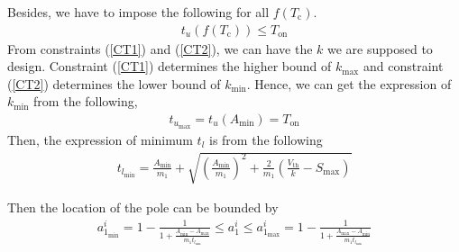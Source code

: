 Besides, we have to impose the following for all $f(T_{\text{c}})$.
\begin{align} \label{CT2}
t_u(f(T_{\text{c}})) \leq T_{\text{on}}
\end{align}
From constraints (\ref{CT1}) and (\ref{CT2}), we can have the $k$ we are supposed to design. Constraint (\ref{CT1}) determines the higher bound of $k_{\text{max}}$ and constraint (\ref{CT2}) determines the lower bound of $k_{\text{min}}$.
Hence, we can get the expression of $k_{\text{min}}$ from the following,
\begin{align}
t_{u_{\text{max}}} = t_u(A_{\text{min}}) = T_{\text{on}}
\end{align}
Then, the expression of minimum $t_l$ is from the following
\begin{align}
t_{l_{\text{min}}}= \frac{A_{\text{min}}}{m_1} + \sqrt{\left(\frac{A_{\text{min}}}{m_1}\right)^2 + \frac{2}{m_1}\left(\frac{V_{\text{th}}}{k}-S_{\text{max}} \right)}
\end{align}

Then the location of the pole can be bounded by
\begin{align} \label{SC21}
a^i_{1_{\text{min}}} =  1 - \frac{1}{1 + \frac{A_{\text{min}}-A_{\text{max}}}{m_1t_{l_{\text{min}}}}} \le a^i_1 \le a^i_{1_{\text{max}}} = 1 - \frac{1}{1 + \frac{A_{\text{max}}-A_{\text{min}}}{m_1t_{l_{\text{min}}}}}
\end{align}


